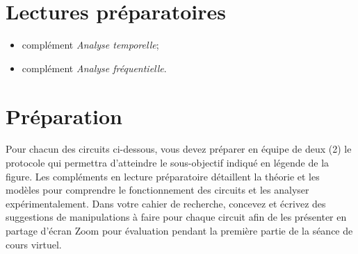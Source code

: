\documentclass[canadien,12pt,oneside,letterpaper]{article}
\begin{document}

\section{Lectures préparatoires}

\begin{itemize}
\item complément \textit{Analyse temporelle};
\item complément \textit{Analyse fréquentielle}.
\end{itemize}





\section{Préparation}

\setlength{\parskip}{1ex plus 0.5ex minus 0.2ex}
Pour chacun des circuits ci-dessous, vous devez préparer en équipe de deux (2) le protocole qui permettra d'atteindre le sous-objectif indiqué en légende de la figure. Les compléments en lecture préparatoire détaillent la théorie et les modèles pour comprendre le fonctionnement des circuits et les analyser expérimentalement. Dans votre cahier de recherche, concevez et écrivez des suggestions de manipulations à faire pour chaque circuit afin de les présenter en partage d'écran Zoom pour évaluation pendant la première partie de la séance de cours virtuel.
\end{document}
